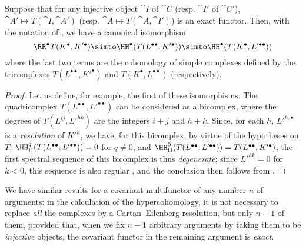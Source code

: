 \begin{proposition}[11.4.7]
\label{0.11.4.7}
Suppose that for any injective object $\cat{I}$ of $\cat{C}$ (resp. $\cat{I'}$ of $\cat{C}'$), $\cat{A'}\mapsto T(\cat{I}, \cat{A'})$ (resp. $\cat{A}\mapsto T(\cat{A}, \cat{I'})$) is an exact functor.
Then, with the notation of , we have a canonical isomorphism
\[
  \RR^\bullet T(K^\bullet, K'^\bullet) \simto \HH^\bullet(T(L^{\bullet\bullet}, K'^\bullet)) \simto \HH^\bullet(T(K^\bullet, L'^{\bullet\bullet})) 
\]
where the last two terms are the cohomology of simple complexes defined by the tricomplexes $T(L^{\bullet\bullet}, K'^\bullet)$ and $T(K^\bullet, L^{\bullet\bullet})$ (respectively).
\end{proposition}

\begin{proof}
Let us define, for example, the first of these isomorphisms.
The quadricomplex $T(L^{\bullet\bullet}, L'^{\bullet\bullet})$ can be considered as a bicomplex, where the degrees of $T(L^{ij}, L'^{hk})$ are the integers $i+j$ and $h+k$.
Since, for each $h$, ${L'}^{h,\bullet}$ is a \emph{resolution} of ${K'}^h$, we have, for this bicomplex, by virtue of the hypotheses on $T$, $\HH_\mathrm{II}^q(T(L^{\bullet\bullet}, L'^{\bullet\bullet}))=0$ for $q\neq 0$, and $\HH_\mathrm{II}^0(T(L^{\bullet\bullet}, L'^{\bullet\bullet})) = T(L^{\bullet\bullet}, K'^\bullet)$;
the first spectral sequence of this bicomplex is thus \emph{degenerate};
since $L'^{hk}=0$ for $k<0$, this sequence is also regular , and the conclusion then follows from .
\end{proof}

We have similar results for a covariant multifunctor of any number $n$ of arguments: in the calculation of the hypercohomology, it is not necessary to replace \emph{all} the complexes 
by a Cartan--Eilenberg resolution, but only $n-1$ of them, provided that, when we fix $n-1$ arbitrary arguments by taking them to be \emph{injective} objects, the covariant functor in the remaining argument is \emph{exact}.


